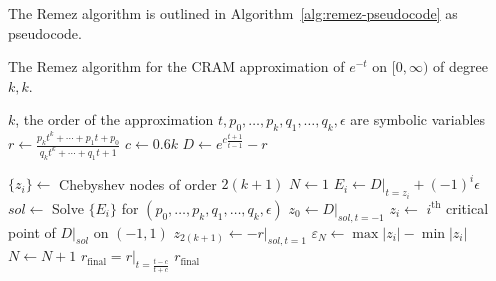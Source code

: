 The Remez algorithm is outlined in Algorithm~\ref{alg:remez-pseudocode} as pseudocode.
\begin{algorithm}
  \caption{The Remez algorithm for the CRAM approximation of $e^{-t}$ on
    $[0, \infty)$ of degree $k,k$.}\label{alg:remez-pseudocode}
  \begin{algorithmic}[1]
    \REQUIRE  $k$, the order of the approximation
    \STATE $t, p_0, \ldots, p_k, q_1, \ldots, q_k, \epsilon$ are symbolic variables
    \STATE $r \leftarrow \frac{p_kt^k + \cdots + p_1t + p_0}{q_kt^k + \cdots +
      q_1t + 1}$
    \STATE $c \leftarrow 0.6k$
    \STATE $D \leftarrow e^{c\frac{t+1}{t-1}} - r$

    \STATE $\{z_i\} \leftarrow$ Chebyshev nodes of order $2(k+1)$
    \STATE $N \leftarrow 1$
    \REPEAT
        \STATE $E_i \leftarrow D|_{t=z_i} + (-1)^i\epsilon$
      \ENDFOR
      \STATE $sol \leftarrow$ Solve $\{E_i\}$ for $(p_0,\ldots,p_k,q_1,\ldots,q_k,\epsilon)$
      \STATE $z_0 \leftarrow D|_{sol,t=-1}$
      \STATE $z_i \leftarrow$ $i^\mathrm{th}$ critical point of $D|_{sol}$ on
      $(-1, 1)$ 
      \STATE $z_{2(k + 1)} \leftarrow -r|_{sol,t=1}$ 
      \STATE $\varepsilon_N \leftarrow \max{|z_i|} - \min{|z_i|}$
      \STATE $N \leftarrow N + 1$
    \STATE $r_\mathrm{final}=r|_{t=\frac{t - c}{t + c}}$ \COMMENT{translate
      $[-1, 1)$ back to $[0, \infty)$ and normalize $q_0=1$}
    \ENSURE $r_\mathrm{final}$
  \end{algorithmic}
\end{algorithm}
